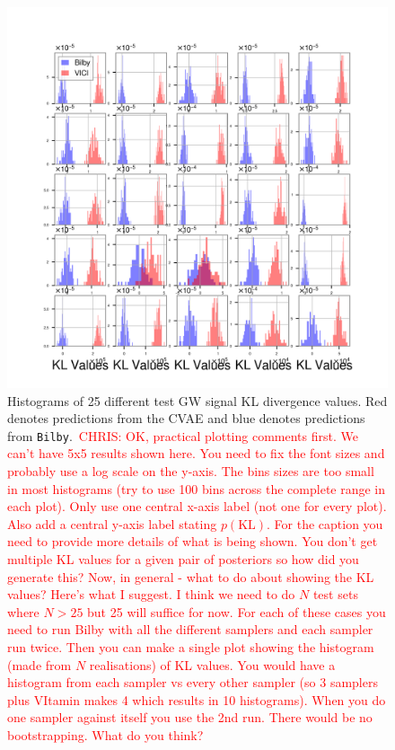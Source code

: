 \documentclass[%
showpacs,
 amsmath,amssymb,
 aps,
 twocolumn,
 prl,
 reprint,
floatfix,
]{revtex4-1}
\newcommand{\chris}[1]{\textcolor{red}{CHRIS: #1}}
\begin{document}
%
%
\begin{figure}
    \includegraphics[width=\columnwidth]{images/hist-kl_0.png}
    \caption{\label{fig:kl_results} Histograms of 25 different test GW signal
KL divergence values.  Red denotes predictions from the CVAE and blue denotes
predictions from \texttt{Bilby}.~\chris{OK, practical plotting comments first.
We can't have 5x5 results shown here. You need to fix the font sizes and
probably use a log scale on the y-axis. The bins sizes are too small in most
histograms (try to use 100 bins across the complete range in each plot). Only
use one central x-axis label (not one for every plot). Also add a central
y-axis label stating $p(\text{KL})$. For the caption you need to provide more
details of what is being shown. You don't get multiple KL values for a given
pair of posteriors so how did you generate this? Now, in general - what to do
about showing the KL values? Here's what I suggest. I think we need to do $N$
test sets where $N>25$ but 25 will suffice for now. For each of these cases you
need to run Bilby with all the different samplers and each sampler run twice.
Then you can make a single plot showing the histogram (made from $N$
realisations) of KL values. You would have a histogram from each sampler vs
every other sampler (so 3 samplers plus VItamin makes 4 which results in 10
histograms). When  you do one sampler against itself you use the 2nd run. There
would be no bootstrapping. What do you think?}}
\end{figure}
\end{document}
